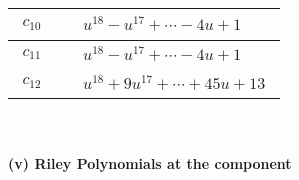 \documentclass[1p]{elsarticle_modified}
\theoremstyle{definition}
\begin{document}
\begin{tabular}{m{50pt}|m{274pt}}
\hline $$\begin{aligned}c_{10}\end{aligned}$$&$\begin{aligned}
&u^{18}- u^{17}+\cdots-4 u+1
\end{aligned}$\\
\hline $$\begin{aligned}c_{11}\end{aligned}$$&$\begin{aligned}
&u^{18}- u^{17}+\cdots-4 u+1
\end{aligned}$\\
\hline $$\begin{aligned}c_{12}\end{aligned}$$&$\begin{aligned}
&u^{18}+9 u^{17}+\cdots+45 u+13
\end{aligned}$\\
\hline
\end{tabular}\\~\\
\newpage\renewcommand{\arraystretch}{1}
\flushleft \textbf{(v) Riley Polynomials at the component}\newline \\
\end{document}
